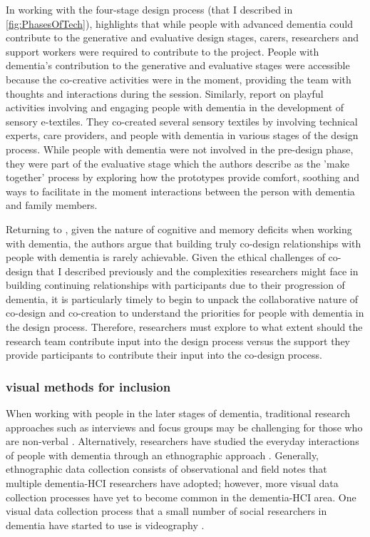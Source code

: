 In working with the four-stage design process (that I described in \ref{fig:PhasesOfTech}), \cite{tsekleves2020engaging} highlights that while people with advanced dementia could contribute to the generative and evaluative design stages, carers, researchers and support workers were required to contribute to the project. People with dementia's contribution to the generative and evaluative stages were accessible because the co-creative activities were in the moment, providing the team with thoughts and interactions during the session. Similarly, \cite{treadaway_sensor_2016} report on playful activities involving and engaging people with dementia in the development of sensory e-textiles. They co-created several sensory textiles by involving technical experts, care providers, and people with dementia in various stages of the design process. While people with dementia were not involved in the pre-design phase, they were part of the evaluative stage which the authors describe as the 'make together' process by exploring how the prototypes provide comfort, soothing and ways to facilitate in the moment interactions between the person with dementia and family members.

Returning to \cite{tsekleves2020engaging}, given the nature of cognitive and memory deficits when working with dementia, the authors argue that building truly co-design relationships with people with dementia is rarely achievable. Given the ethical challenges of co-design that I described previously and the complexities researchers might face in building continuing relationships with participants due to their progression of dementia, it is particularly timely to begin to unpack the collaborative nature of co-design and co-creation to understand the priorities for people with dementia in the design process. Therefore, researchers must explore to what extent should the research team contribute input into the design process versus the support they provide participants to contribute their input into the co-design process.

\subsubsection{visual methods for inclusion}
When working with people in the later stages of dementia, traditional research approaches such as interviews and focus groups may be challenging for those who are non-verbal \citep{swarbrick2015quest}. Alternatively, researchers have studied the everyday interactions of people with dementia through an ethnographic approach \citep{kontos_ethnographic_2004,morrissey_value_2017,foley_care_2019}. Generally, ethnographic data collection consists of observational and field notes that multiple dementia-HCI researchers have adopted; however, more visual data collection processes have yet to become common in the dementia-HCI area. One visual data collection process that a small number of social researchers in dementia have started to use is videography \citep{phillipson2018more}.

